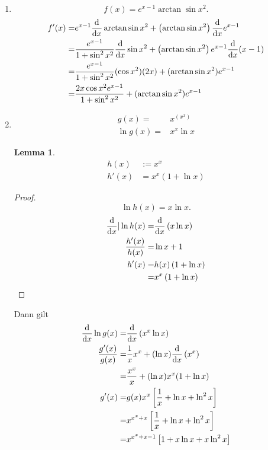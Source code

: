 \documentclass[prb,12pt]{revtex4-2}
\newtheorem{Lemma}[Theorem]{Lemma}
\theoremstyle{definition}
\theoremstyle{definition}
\newenvironment{parts}{\begin{enumerate}[label=(\alph*)]}{\end{enumerate}}
\begin{document}
	\begin{parts}
		\item 
			\[
				f(x)=e^{x-1}\arctan\sin x^2
			.\] 
			\begin{align*}
				f'(x)=& e^{x-1}\dv{x}\arctan\sin x^2+\left( \arctan\sin x^2 \right) \dv{x}e^{x-1}\\
			=&\frac{e^{x-1}}{1+\sin^2 x^2}\dv{x}\sin x^2+\left( \arctan\sin x^2 \right)e^{x-1}\dv{x}(x-1)\\
			=&\frac{e^{x-1}}{1+\sin^2 x^2}(\cos x^2)(2x)+(\arctan\sin x^2)e^{x-1}\\
			=& \frac{2x\cos x^2 e^{x-1}}{1+\sin^2 x^2}+(\arctan\sin x^2)e^{x-1}
			\end{align*}
		\item 
			\begin{align*}
				g(x)=& x^{(x^x)}\\
				\ln g(x)=& x^x\ln x
			\end{align*}

			\begin{Lemma}
				\begin{align*}
					h(x)&:=x^x\\
					h'(x)&=x^x(1+\ln x)
				\end{align*}
			\end{Lemma}
			\begin{proof}
				\[
				\ln h(x)=x\ln x
				.\] 
				\begin{align*}
					\dv{x}|\ln h(x)=&\dv{x}\left( x\ln x \right) \\
					\frac{h'(x)}{h(x)}=&\ln x+1\\
					h'(x)=&h(x)\left( 1+\ln x \right) \\
					=&x^x\left( 1+\ln x \right) 
				\end{align*}
			\end{proof}
			Dann gilt
	\begin{align*}
		\dv{x}\ln g(x)=&\dv{x}\left( x^x \ln x \right) \\
		\frac{g'(x)}{g(x)}=&\frac{1}{x}x^x+(\ln x)\dv{x}\left( x^x \right) \\
		=&\frac{x^x}{x}+(\ln x)x^x (1+\ln x)\\
		g'(x)=&g(x)x^x\left[ \frac{1}{x}+\ln x+\ln^2x \right] \\
		=& x^{x^x+x}\left[ \frac{1}{x}+\ln x+\ln^2x \right] \\
		=& x^{x^x+x-1}\left[ 1+x\ln x+x\ln^2 x \right] 
	\end{align*}
		\end{parts}
\end{document}
